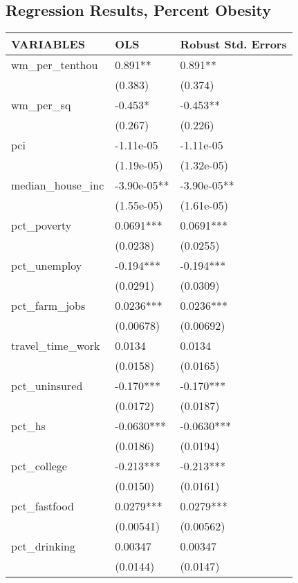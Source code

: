 \subsection{Regression Results, Percent Obesity}
\fontsize{5bp}{5bp}\selectfont
\begin{tabular}{|l|l|l|}
\hline
VARIABLES & OLS & Robust Std. Errors \\      \hline 
wm\_per\_tenthou & 0.891** & 0.891** \\      \hline
 & (0.383) & (0.374) \\      \hline
wm\_per\_sq & -0.453* & -0.453** \\      \hline
 & (0.267) & (0.226) \\      \hline
pci & -1.11e-05 & -1.11e-05 \\      \hline
 & (1.19e-05) & (1.32e-05) \\      \hline
median\_house\_inc & -3.90e-05** & -3.90e-05** \\      \hline
 & (1.55e-05) & (1.61e-05) \\      \hline
pct\_poverty & 0.0691*** & 0.0691*** \\      \hline
 & (0.0238) & (0.0255) \\      \hline
pct\_unemploy & -0.194*** & -0.194*** \\      \hline
 & (0.0291) & (0.0309) \\      \hline
pct\_farm\_jobs & 0.0236*** & 0.0236*** \\      \hline
 & (0.00678) & (0.00692) \\      \hline
travel\_time\_work & 0.0134 & 0.0134 \\      \hline
 & (0.0158) & (0.0165) \\      \hline
pct\_uninsured & -0.170*** & -0.170*** \\      \hline
 & (0.0172) & (0.0187) \\      \hline
pct\_hs & -0.0630*** & -0.0630*** \\      \hline
 & (0.0186) & (0.0194) \\      \hline
pct\_college & -0.213*** & -0.213*** \\      \hline
 & (0.0150) & (0.0161) \\      \hline
pct\_fastfood & 0.0279*** & 0.0279*** \\      \hline
 & (0.00541) & (0.00562) \\      \hline
pct\_drinking & 0.00347 & 0.00347 \\      \hline
 & (0.0144) & (0.0147) \\      \hline

\end{tabular}
